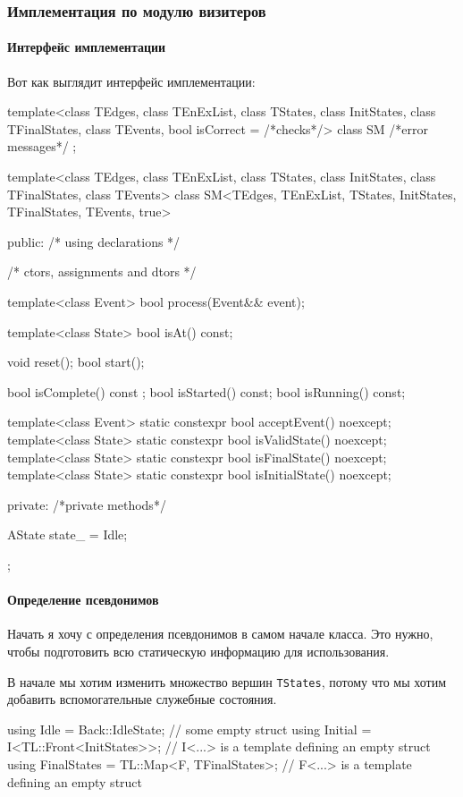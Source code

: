 \documentclass{article}
\begin{document}
{\subsubsection{Имплементация по модулю визитеров}

\paragraph{Интерфейс имплементации}

Вот как выглядит интерфейс имплементации:
\begin{cppcode}
template<class TEdges, class TEnExList, class TStates, class InitStates, class TFinalStates,
         class TEvents, bool isCorrect = /*checks*/>
class SM {
  /*error messages*/
};

template<class TEdges, class TEnExList, class TStates, class InitStates, class TFinalStates,
         class TEvents>
class SM<TEdges, TEnExList, TStates, InitStates, TFinalStates, TEvents, true> {
public:
  /* using declarations */

  /* ctors, assignments and dtors */

  template<class Event>
  bool process(Event&& event);

  template<class State>
  bool isAt() const;

  void reset();
  bool start();

  bool isComplete() const ;
  bool isStarted() const;
  bool isRunning() const;

  template<class Event>
  static constexpr bool acceptEvent() noexcept;
  template<class State>
  static constexpr bool isValidState() noexcept;
  template<class State>
  static constexpr bool isFinalState() noexcept;
  template<class State>
  static constexpr bool isInitialState() noexcept;
  
private:
  /*private methods*/

  AState state_ = Idle{};
};
\end{cppcode}

\paragraph{Определение псевдонимов}

Начать я хочу с определения псевдонимов в самом начале класса.
Это нужно, чтобы подготовить всю статическую информацию для использования.

В начале мы хотим изменить множество вершин \verb"TStates", потому что мы хотим добавить вспомогательные служебные состояния.
\begin{cppcode}[\nonumbers]
using Idle = Back::IdleState; // some empty struct
using Initial = I<TL::Front<InitStates>>; // I<...> is a template defining an empty struct
using FinalStates = TL::Map<F, TFinalStates>; // F<...> is a template defining an empty struct


\end{cppcode}}
\end{document}
